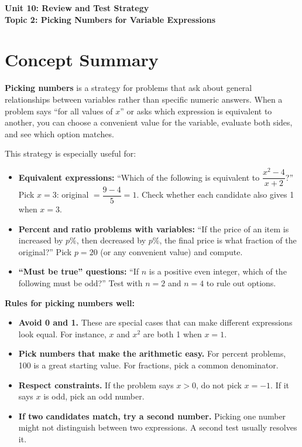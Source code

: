 \documentclass[14pt]{extarticle}
\begin{document}
\raggedright
{}

\begin{center}
    \LARGE \textbf{Unit 10: Review and Test Strategy} \\[6pt]
    \Large \textbf{Topic 2: Picking Numbers for Variable Expressions}
\end{center}

\vspace{1em}

\section*{Concept Summary}

\textbf{Picking numbers} is a strategy for problems that ask about general relationships between variables rather than specific numeric answers. When a problem says ``for all values of \(x\)'' or asks which expression is equivalent to another, you can choose a convenient value for the variable, evaluate both sides, and see which option matches.

This strategy is especially useful for:

\begin{itemize}
  \item \textbf{Equivalent expressions:} ``Which of the following is equivalent to \(\dfrac{x^2 - 4}{x + 2}\)?'' Pick \(x = 3\): original \(= \dfrac{9 - 4}{5} = 1\). Check whether each candidate also gives 1 when \(x = 3\).
  \item \textbf{Percent and ratio problems with variables:} ``If the price of an item is increased by \(p\%\), then decreased by \(p\%\), the final price is what fraction of the original?'' Pick \(p = 20\) (or any convenient value) and compute.
  \item \textbf{``Must be true'' questions:} ``If \(n\) is a positive even integer, which of the following must be odd?'' Test with \(n = 2\) and \(n = 4\) to rule out options.
\end{itemize}

\textbf{Rules for picking numbers well:}

\begin{itemize}
  \item \textbf{Avoid 0 and 1.} These are special cases that can make different expressions look equal. For instance, \(x\) and \(x^2\) are both 1 when \(x = 1\).
  \item \textbf{Pick numbers that make the arithmetic easy.} For percent problems, 100 is a great starting value. For fractions, pick a common denominator.
  \item \textbf{Respect constraints.} If the problem says \(x > 0\), do not pick \(x = -1\). If it says \(x\) is odd, pick an odd number.
  \item \textbf{If two candidates match, try a second number.} Picking one number might not distinguish between two expressions. A second test usually resolves it.
\end{itemize}
\end{document}
